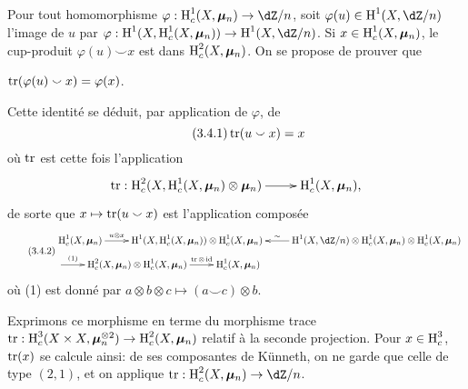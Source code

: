 \subsection{}\label{V:3-3}

Pour tout homomorphisme $\varphi:\h_c^1(X,\dmu_n)\to \dZ/n$, soit 
$\varphi(u)\in \h^1(X,\dZ/n)$ l'image de $u$ par 
$\varphi:\h^1(X,\h_c^1(X,\dmu_n)) \to \h^1(X,\dZ/n)$. Si 
$x\in \operatorname{H}_c^1(X,{\bm\mu}_n)$, le cup-produit $\varphi(u)\smallsmile x$ est dans 
$\operatorname{H}_c^2(X,{\bm\mu}_n)$. On se propose de prouver que 





\begin{proposition_}\label{V:3-4}
$\operatorname{tr}(\varphi(u)\smallsmile x) = \varphi(x)$.
\end{proposition_}

Cette identité se déduit, par application de $\varphi$, de 
\begin{equation*}\tag{3.4.1}\label{V:eq:3-4-1}
  \operatorname{tr}(u\smallsmile x) = x 
\end{equation*}
où $\operatorname{tr}$ est cette fois l'application 
\[\xymatrix{
  \tr:\h_c^2(X,\h_c^1(X,\dmu_n)\otimes\dmu_n) \ar[r] 
    & \h_c^1(X,\dmu_n) \text{,}
}\]
de sorte que $x\mapsto \operatorname{tr}(u\smallsmile x)$ est l'application composée 
\small
\begin{equation*}\tag{3.4.2}\label{V:eq:3-4-2}
\begin{aligned}
&\xymatrix{
  \h_c^1(X,\dmu_n) \ar[r]^-{u\otimes x} 
    & \h^1(X,\h_c^1(X,\dmu_n)) \otimes \h_c^1(X,\dmu_n) 
    & \ar[l]_-\sim \h^1(X,\dZ/n)\otimes \h_c^1(X,\dmu_n) \otimes \h_c^1(X,\dmu_n)} \\ &\xymatrix{
    \ar[r]^-{(1)} 
      & \h_c^2(X,\dmu_n) \otimes \h_c^1(X,\dmu_n) \ar[r]^-{\tr\otimes\operatorname{id}} 
      & \h_c^1(X,\dmu_n)
}
\end{aligned}
\end{equation*}
\normalsize
où (1) est donné par 
$a\otimes b\otimes c\mapsto (a\smallsmile c)\otimes b$. 

Exprimons ce morphisme en terme du morphisme trace 
$\operatorname{tr}:\operatorname{H}_c^3(X\times X,{\bm\mu}_n^{\otimes 2}) \to \operatorname{H}_c^2(X,{\bm\mu}_n)$ relatif à la 
seconde projection. Pour $x\in \operatorname{H}_c^3$, $\operatorname{tr}(x)$ se calcule ainsi: de ses 
composantes de K\"unneth, on ne garde que celle de type $(2,1)$, et on applique 
$\tr:\h_c^2(X,\dmu_n) \to \dZ/n$. 

